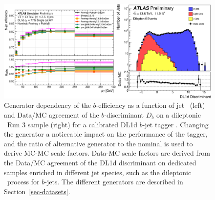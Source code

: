 \begin{center}
  \begin{figure}[h!]
  \centerline{
  \includegraphics[width=\textwidth]{Images/FTAG/calib/sfAg.png}
  }
  \caption{Generator dependency of the $b$-efficiency as a function of jet \pt\ (left) and Data/MC agreement of the $b$-discriminant $D_b$ on a dileptonic \ttb\ Run 3 sample (right) for a calibrated DL1d $b$-jet tagger \cite{ATL-PLOT-FTAG-2023-01}. Changing the generator a noticeable impact on the performance of the tagger, and the ratio of alternative generator to the nominal is used to derive MC-MC scale factors. Data-MC scale factors are derived from the Data/MC agreement of the DL1d discriminant on dedicated samples enriched in different jet species, such as the dileptonic \ttb\ process for $b$-jets. The different generators are described in Section~\ref{sec-datasets}.}
  \label{fig:calibFtagDL1d}
  \end{figure} 
\end{center}


